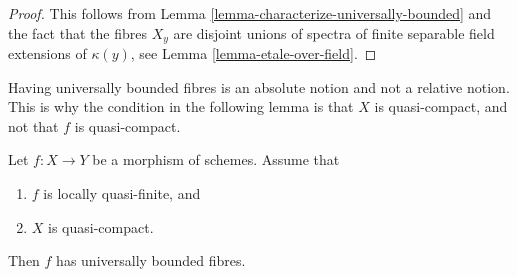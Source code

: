 \begin{proof}
This follows from
Lemma \ref{lemma-characterize-universally-bounded}
and the fact that the fibres $X_y$ are disjoint unions of spectra of finite
separable field extensions of $\kappa(y)$, see
Lemma \ref{lemma-etale-over-field}.
\end{proof}

\noindent
Having universally bounded fibres is an absolute notion and not a relative
notion. This is why the condition in the following lemma is that $X$ is
quasi-compact, and not that $f$ is quasi-compact.

\begin{lemma}
\label{lemma-locally-quasi-finite-qc-source-universally-bounded}
Let $f : X \to Y$ be a morphism of schemes.
Assume that
\begin{enumerate}
\item $f$ is locally quasi-finite, and
\item $X$ is quasi-compact.
\end{enumerate}
Then $f$ has universally bounded fibres.
\end{lemma}

